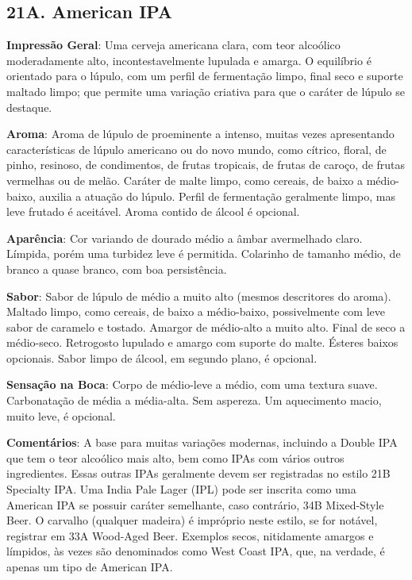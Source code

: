 \subsection*{21A. American IPA}
\textbf{Impressão Geral}: Uma cerveja americana clara, com teor alcoólico moderadamente alto, incontestavelmente lupulada e amarga. O equilíbrio é orientado para o lúpulo, com um perfil de fermentação limpo, final seco e suporte maltado limpo; que permite uma variação criativa para que o caráter de lúpulo se destaque.

\textbf{Aroma}: Aroma de lúpulo de proeminente a intenso, muitas vezes apresentando características de lúpulo americano ou do novo mundo, como cítrico, floral, de pinho, resinoso, de condimentos, de frutas tropicais, de frutas de caroço, de frutas vermelhas ou de melão. Caráter de malte limpo, como cereais, de baixo a médio-baixo, auxilia a atuação do lúpulo. Perfil de fermentação geralmente limpo, mas leve frutado é aceitável. Aroma contido de álcool é opcional.

\textbf{Aparência}: Cor variando de dourado médio a âmbar avermelhado claro. Límpida, porém uma turbidez leve é permitida. Colarinho de tamanho médio, de branco a quase branco, com boa persistência.

\textbf{Sabor}: Sabor de lúpulo de médio a muito alto (mesmos descritores do aroma). Maltado limpo, como cereais, de baixo a médio-baixo, possivelmente com leve sabor de caramelo e tostado. Amargor de médio-alto a muito alto. Final de seco a médio-seco. Retrogosto lupulado e amargo com suporte do malte. Ésteres baixos opcionais. Sabor limpo de álcool, em segundo plano, é opcional.

\textbf{Sensação na Boca}: Corpo de médio-leve a médio, com uma textura suave. Carbonatação de média a média-alta. Sem aspereza. Um aquecimento macio, muito leve, é opcional.

\textbf{Comentários}: A base para muitas variações modernas, incluindo a Double IPA que tem o teor alcoólico mais alto, bem como IPAs com vários outros ingredientes. Essas outras IPAs geralmente devem ser registradas no estilo 21B Specialty IPA. Uma India Pale Lager (IPL) pode ser inscrita como uma American IPA se possuir caráter semelhante, caso contrário, 34B Mixed-Style Beer. O carvalho (qualquer madeira) é impróprio neste estilo, se for notável, registrar em 33A Wood-Aged Beer. Exemplos secos, nitidamente amargos e límpidos, às vezes são denominados como West Coast IPA, que, na verdade, é apenas um tipo de American IPA.

